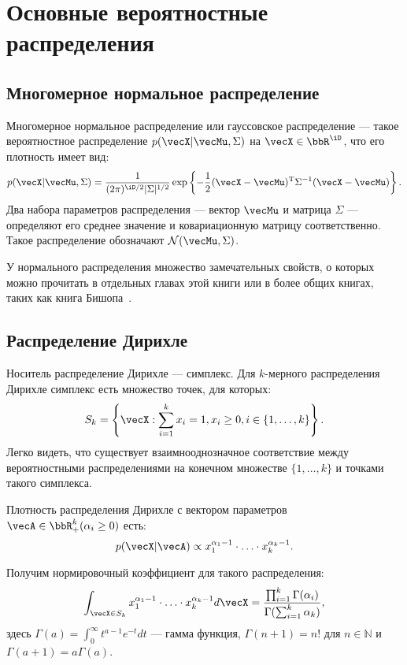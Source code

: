 \section{Основные вероятностные распределения}

\subsection{Многомерное нормальное распределение}
\label{sec:gauss}

Многомерное нормальное распределение или гауссовское распределение --- такое вероятностное распределение $p(\vecX | \vecMu, \Sigma)$ на $\vecX \in \bbR^\iD$, что его плотность имеет вид:
\[
p(\vecX | \vecMu, \Sigma) = \frac{1}{(2 \pi)^{\iD / 2} |\Sigma|^{1 / 2}}
\exp \left\{- \frac12 (\vecX - \vecMu)^{\mathrm{T}} \Sigma^{-1} (\vecX - \vecMu) \right\}.
\]
Два набора параметров распределения --- вектор $\vecMu$ и матрица $\Sigma$ --- определяют его среднее значение и ковариационную матрицу соответственно.
Такое распределение обозначают $\mathcal{N}(\vecMu, \Sigma)$.

У нормального распределения множество замечательных свойств, о которых можно прочитать в отдельных главах этой книги или в более общих книгах, таких как книга Бишопа~\cite{bishop2006pattern}.

\subsection{Распределение Дирихле}
\label{sec:dirichlet}

Носитель распределение Дирихле --- симплекс.
Для $k$-мерного распределения Дирихле симплекс есть множество точек, для которых:
\[
S_k = \left\{ \vecX: \sum_{i = 1}^k x_i = 1, x_i \geq 0, i \in \{1, \ldots, k\} \right\}.
\]
Легко видеть, что существует взаимнооднозначное соответствие между вероятностными распределениями на конечном множестве $\{1, \ldots, k\}$ и точками такого симплекса.

Плотность распределения Дирихле с вектором параметров $\vecA \in \bbR_+^k (\alpha_i \geq 0)$ есть:
\[
p(\vecX | \vecA) \propto x_1^{\alpha_1 - 1} \cdot \ldots \cdot x_k^{\alpha_k - 1}.
\]

Получим нормировочный коэффициент для такого распределения:
\[
\int_{\vecX \in S_k} x_1^{\alpha_1 - 1} \cdot \ldots \cdot x_k^{\alpha_k - 1} d\vecX = \frac{\prod_{i = 1}^k \Gamma(\alpha_i)}{\Gamma(\sum_{i = 1}^k \alpha_k)},
\]
здесь $\Gamma(a) = \int_{0}^{\infty} t^{a - 1} e^{-t} dt$ --- гамма функция, $\Gamma(n + 1) = n!$ для $n \in \mathbb{N}$ и $\Gamma(a + 1) = a \Gamma(a)$.

